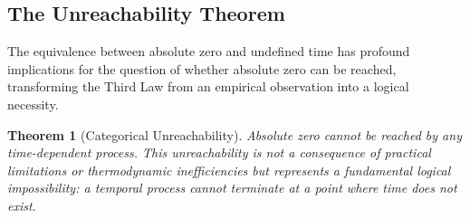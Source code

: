 \documentclass[12pt,a4paper]{article}
\newtheorem{theorem}{Theorem}[section]
\theoremstyle{definition}
\theoremstyle{remark}
\begin{document}
\subsection{The Unreachability Theorem}

The equivalence between absolute zero and undefined time has profound implications for the question of whether absolute zero can be reached, transforming the Third Law from an empirical observation into a logical necessity.

\begin{theorem}[Categorical Unreachability]
\label{thm:categorical_unreachability}
Absolute zero cannot be reached by any time-dependent process. This unreachability is not a consequence of practical limitations or thermodynamic inefficiencies but represents a fundamental logical impossibility: a temporal process cannot terminate at a point where time does not exist.
\end{theorem}
\end{document}
